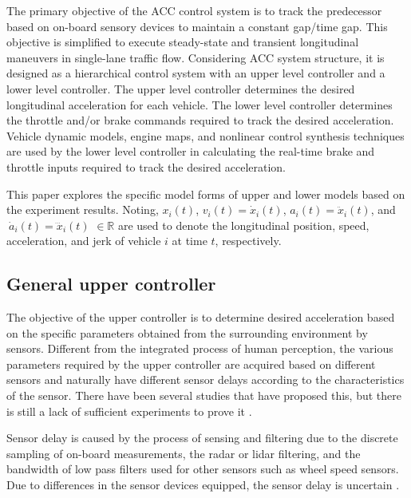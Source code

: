 \documentclass[journal]{IEEEtran}
\begin{document}
The primary objective of the ACC control system is to track the predecessor based on on-board sensory devices to maintain a constant gap/time gap. This objective is simplified to execute steady-state and transient longitudinal maneuvers in single-lane traffic flow. Considering ACC system structure, it is designed as a hierarchical control system with an upper level controller and a lower level controller. The upper level controller determines the desired longitudinal acceleration for each vehicle. The lower level controller determines the throttle and/or brake commands required to track the desired acceleration. Vehicle dynamic models, engine maps, and nonlinear control synthesis techniques \citep{Choi1995,Choi1995a,Hedrick1991,Hedrick1993} are used by the lower level controller in calculating the real-time brake and throttle inputs required to track the desired acceleration.

This paper explores the specific model forms of upper and lower models based on the experiment results. Noting, $x_i\left(t\right)$, $v_i\left(t\right)={\dot{x}}_i\left(t\right)$, $a_i\left(t\right)={\ddot{x}}_i\left(t\right)$, and $\ {\dot{a}}_i\left(t\right)={\dddot{x}}_i\left(t\right)$ $\in\mathbb{R}$ are used to denote the longitudinal position, speed, acceleration, and jerk of vehicle $i$ at time $t$, respectively.

\subsection{General upper controller}
\label{Section 2.2}

The objective of the upper controller is to determine desired acceleration based on the specific parameters obtained from the surrounding environment by sensors. Different from the integrated process of human perception, the various parameters required by the upper controller are acquired based on different sensors and naturally have different sensor delays according to the characteristics of the sensor. There have been several studies that have proposed this, but there is still a lack of sufficient experiments to prove it \citep{Ngoduy2013a,Yao2021}.

Sensor delay is caused by the process of sensing and filtering due to the discrete sampling of on-board measurements, the radar or lidar filtering, and the bandwidth of low pass filters used for other sensors such as wheel speed sensors. Due to differences in the sensor devices equipped, the sensor delay is uncertain \citep{Loke2019}.
\end{document}
